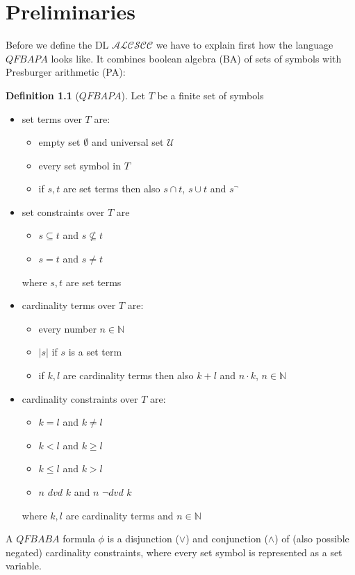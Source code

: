 \documentclass{book}
\theoremstyle{break}
\theoremstyle{definition}
\newtheorem{mydef}{Definition}
\begin{document}
\chapter{Preliminaries}
Before we define the DL $\mathcal{ALCSCC}$ we have to explain first how the language $QFBAPA$ looks like. It combines boolean algebra (BA) of sets of symbols with Presburger arithmetic (PA):
\begin{mydef}[$QFBAPA$]
Let $T$ be a finite set of symbols
\begin{itemize}
\item set terms over $T$ are:
\begin{itemize}
\item empty set $\emptyset$ and universal set $
\mathcal{U}$
\item every set symbol in $T$
\item if $s,t$ are set terms then also $s\cap t$, $s\cup t$ and $s^{\neg}$
\end{itemize}
\item set constraints over $T$ are
\begin{itemize}
\item $s\subseteq t$ and $s\not\subseteq t$
\item $s=t$ and $s\neq t$
\end{itemize}
where $s,t$ are set terms
\item cardinality terms over $T$ are:
\begin{itemize}
\item every number $n\in \mathbb{N}$
\item $|s|$ if $s$ is a set term
\item if $k,l$ are cardinality terms then also $k+l$ and $n\cdot k$, $n\in \mathbb{N}$
\end{itemize}
\item cardinality constraints over $T$ are:
\begin{itemize}
\item $k=l$ and $k\neq l$
\item $k<l$ and $k\geq l$
\item $k\leq l$ and $k>l$
\item $n$ $dvd$ $k$ and $n$ $\neg dvd$ $k$
\end{itemize}
where $k,l$ are cardinality terms and $n\in\mathbb{N}$
\end{itemize}
A $QFBABA$ formula $\phi$ is a disjunction ($\vee$) and conjunction ($\wedge$) of (also possible negated) cardinality constraints, where every set symbol is represented as a set variable.
\end{mydef}
\end{document}

